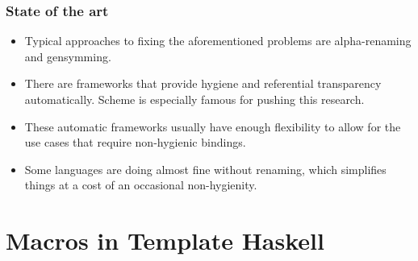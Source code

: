 \documentclass[hyperref={bookmarks=false}]{beamer}
\begin{document}
\begin{frame}[fragile]
\frametitle{State of the art}

\begin{itemize}
\item Typical approaches to fixing the aforementioned problems
are alpha-renaming and gensymming.
\item There are frameworks that provide hygiene and referential transparency automatically.
Scheme is especially famous for pushing this research.
\item These automatic frameworks usually have enough flexibility to allow for
the use cases that require non-hygienic bindings.
\item Some languages are doing almost fine without renaming,
which simplifies things at a cost of an occasional non-hygienity.
\end{itemize}

\end{frame}

\section{Macros in Template Haskell}
\end{document}
